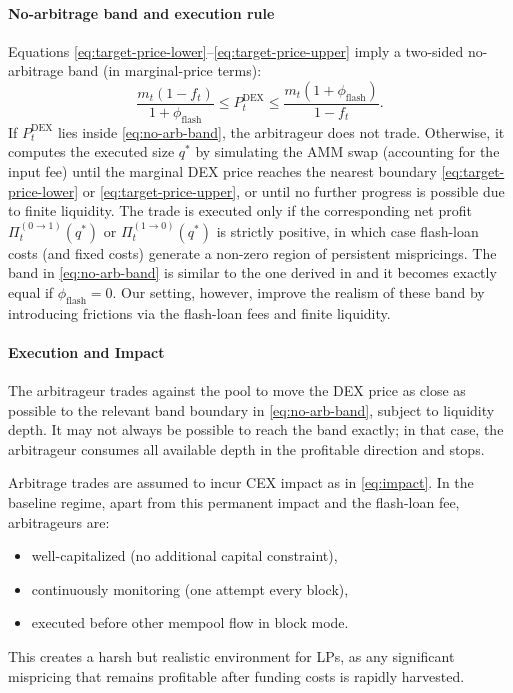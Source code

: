 \documentclass[11pt]{article}
\begin{document}
\paragraph{No-arbitrage band and execution rule}

Equations \eqref{eq:target-price-lower}--\eqref{eq:target-price-upper} imply a two-sided no-arbitrage band
(in marginal-price terms):
\begin{equation}
  \frac{m_t(1-f_t)}{1+\phi_{\mathrm{flash}}}
  \le
  P_t^{\mathrm{DEX}}
  \le
  \frac{m_t(1+\phi_{\mathrm{flash}})}{1-f_t}.
  \label{eq:no-arb-band}
\end{equation}
If $P_t^{\mathrm{DEX}}$ lies inside \eqref{eq:no-arb-band}, the arbitrageur does not trade.
Otherwise, it computes the executed size $q^*$ by simulating the AMM swap (accounting for the input fee)
until the marginal DEX price reaches the nearest boundary
\eqref{eq:target-price-lower} or \eqref{eq:target-price-upper}, or until no further progress is possible
due to finite liquidity. The trade is executed only if the corresponding net profit
$\Pi_t^{(0\rightarrow 1)}(q^*)$ or $\Pi_t^{(1\rightarrow 0)}(q^*)$ is strictly positive, in which case
flash-loan costs (and fixed costs) generate a non-zero region of persistent mispricings. The band in \ref{eq:no-arb-band} is similar to the one derived in \cite{angeris2021analysis} and it becomes exactly equal if $\phi_{\text{flash}}=0$. Our setting, however, improve the realism of these band by introducing frictions via the flash-loan fees and finite liquidity.

\paragraph{Execution and Impact}

The arbitrageur trades against the pool
to move the DEX price as close as possible to the relevant band boundary in \eqref{eq:no-arb-band},
subject to liquidity depth. It may not always be possible to reach the band exactly; in that case,
the arbitrageur consumes all available depth in the profitable direction and stops.

Arbitrage trades are assumed to incur CEX impact as in \eqref{eq:impact}. In the baseline regime,
apart from this permanent impact and the flash-loan fee, arbitrageurs are:
\begin{itemize}[leftmargin=*]
  \item well-capitalized (no additional capital constraint),
  \item continuously monitoring (one attempt every block),
  \item executed before other mempool flow in block mode.
\end{itemize}
This creates a harsh but realistic environment for LPs, as any significant mispricing that remains profitable
after funding costs is rapidly harvested.
\end{document}
